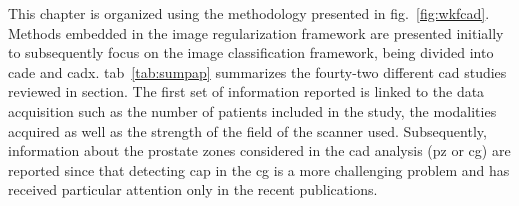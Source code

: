 


This chapter is organized using the methodology presented in \acs{fig}.~\ref{fig:wkfcad}.
Methods embedded in the image regularization framework are presented initially to subsequently focus on the image classification framework, being divided into \ac{cade} and \ac{cadx}.
\Acl{tab}~\ref{tab:sumpap} summarizes the fourty-two different \ac{cad} studies reviewed in section.
The first set of information reported is linked to the data acquisition such as the number of patients included in the study, the modalities acquired as well as the strength of the field of the scanner used.
Subsequently, information about the prostate zones considered in the \ac{cad} analysis (\ac{pz} or \ac{cg}) are reported since that detecting \ac{cap} in the \ac{cg} is a more challenging problem and has received particular attention only in the recent publications.




